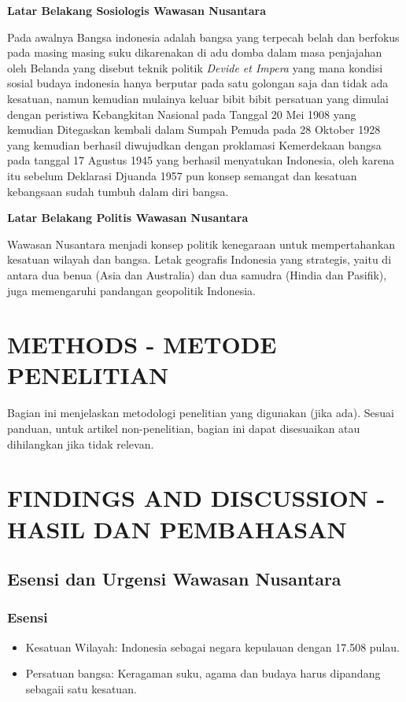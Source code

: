 \documentclass[12pt, a4paper]{article}
\begin{document}
\textbf{Latar Belakang Sosiologis Wawasan Nusantara}

Pada awalnya Bangsa indonesia adalah bangsa yang terpecah belah dan berfokus pada masing masing suku dikarenakan di adu domba dalam masa penjajahan oleh Belanda yang disebut teknik politik \textit{Devide et Impera} yang mana kondisi sosial budaya indonesia hanya berputar pada satu golongan saja dan tidak ada kesatuan, namun kemudian mulainya keluar bibit bibit persatuan yang dimulai dengan peristiwa Kebangkitan Nasional pada Tanggal 20 Mei 1908 yang kemudian Ditegaskan kembali dalam Sumpah Pemuda pada 28 Oktober 1928 yang kemudian berhasil diwujudkan dengan proklamasi Kemerdekaan bangsa pada tanggal 17 Agustus 1945 yang berhasil menyatukan Indonesia, oleh karena itu sebelum Deklarasi Djuanda 1957 pun konsep semangat dan kesatuan kebangsaan sudah tumbuh dalam diri bangsa.

\textbf{Latar Belakang Politis Wawasan Nusantara}

Wawasan Nusantara menjadi konsep politik kenegaraan untuk mempertahankan kesatuan wilayah dan bangsa. Letak geografis Indonesia yang strategis, yaitu di antara dua benua (Asia dan Australia) dan dua samudra (Hindia dan Pasifik), juga memengaruhi pandangan geopolitik Indonesia.

\section*{METHODS - METODE PENELITIAN}
Bagian ini menjelaskan metodologi penelitian yang digunakan (jika ada). Sesuai panduan, untuk artikel non-penelitian, bagian ini dapat disesuaikan atau dihilangkan jika tidak relevan.

\section*{FINDINGS AND DISCUSSION - HASIL DAN PEMBAHASAN}

\subsection*{Esensi dan Urgensi Wawasan Nusantara}
\subsubsection*{Esensi}
\begin{itemize}
    \item Kesatuan Wilayah: Indonesia sebagai negara kepulauan dengan 17.508 pulau.
    \item Persatuan bangsa: Keragaman suku, agama dan budaya harus dipandang sebagaii satu kesatuan.
\end{itemize}
\end{document}

